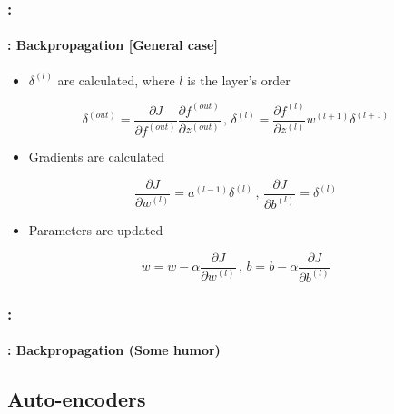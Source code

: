 \documentclass[xcolor=table]{beamer}
\begin{document}
\begin{frame}
	\frametitle{\insertshortsubtitle: \insertsection}
	\framesubtitle{\insertsubsection: Backpropagation [General case]}
	
	\begin{itemize}
		\item $\delta^{(l)}$  are calculated, where $l$ is the layer's order
	\end{itemize}
	
	\[ 
	\delta^{(out)} = 
	\frac{\partial J}{\partial f^{(out)}} \frac{\partial f^{(out)}}{\partial z^{(out)}}
	\,,\,
	\delta^{(l)} = \frac{\partial f^{(l)}}{\partial z^{(l)}} w^{(l+1)} \delta^{(l+1)}
	\]
	
	\begin{itemize}
		\item Gradients are calculated
	\end{itemize}
	
	\[ 
	\frac{\partial J}{\partial w^{(l)}} = a^{(l-1)} \delta^{(l)}
	\,,\,
	\frac{\partial J}{\partial b^{(l)}} = \delta^{(l)}
	\]
	
	\begin{itemize}
		\item Parameters are updated
	\end{itemize}
	
	\[ 
	w = w - \alpha \frac{\partial J}{\partial w^{(l)}}
	\,,\,
	b = b - \alpha \frac{\partial J}{\partial b^{(l)}}
	\]

\end{frame}

\begin{frame}
	\frametitle{\insertshortsubtitle: \insertsection}
	\framesubtitle{\insertsubsection: Backpropagation (Some humor)}
	

\end{frame}

\subsection{Auto-encoders}
\end{document}
